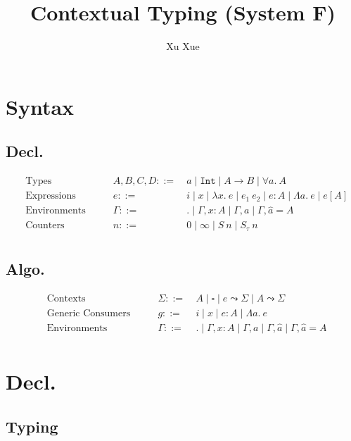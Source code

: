 \documentclass{article}
\title{Contextual Typing (System F)}
\author{Xu Xue}
\begin{document}
\maketitle

\section{Syntax}

\subsection{Decl.}

\begin{align*}
&\text{Types} \quad\quad &A, B, C, D ::=&~ a \mid \mathtt{Int} \mid A \rightarrow B \mid \forall a.~A\\
&\text{Expressions} \quad \quad &e::=&~ i \mid x \mid \lambda x . ~e \mid e_1~e_2 \mid e : A \mid \Lambda a.~e \mid e[A]\\
&\text{Environments} \quad\quad &\Gamma::=&~ . \mid \Gamma, x : A \mid \Gamma, a \mid \Gamma, \hat{a} = A\\
&\text{Counters} \quad\quad &n ::=&~ 0 \mid \infty \mid S~n \mid S_{\tau}~n\\
\end{align*}

\subsection{Algo.}

\begin{align*}
    &\text{Contexts} \quad\quad &\Sigma ::=&~ A \mid \square \mid \boxed{e} \leadsto \Sigma \mid \boxed{A} \leadsto \Sigma\\
    &\text{Generic Consumers} \quad \quad &g::=&~ i \mid x \mid e : A \mid \Lambda a.~e\\
    &\text{Environments} \quad\quad &\Gamma ::=&~ . \mid \Gamma, x : A \mid \Gamma, a \mid \Gamma, \hat{a} \mid \Gamma, \hat{a}= A\\
\end{align*}


\section{Decl.}

\subsection{Typing}
\end{document}
